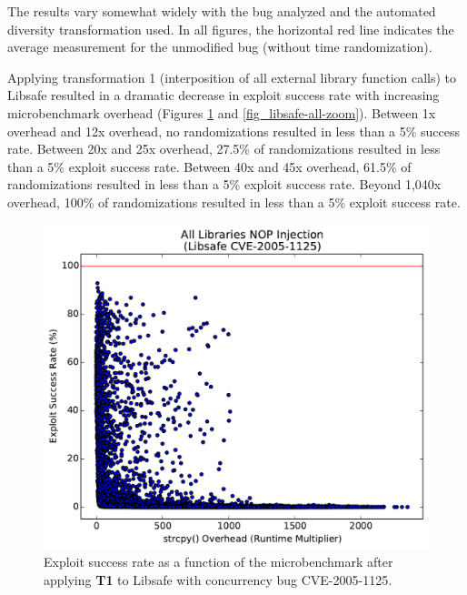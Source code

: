 The results vary somewhat widely with the bug analyzed and the automated diversity transformation used.
In all figures, the horizontal red line indicates the average measurement for the unmodified bug (without time randomization).

Applying transformation 1 (interposition of all external library function calls) to Libsafe resulted in a dramatic decrease in exploit success rate with increasing microbenchmark overhead (Figures \ref{fig_libsafe-all} and \ref{fig_libsafe-all-zoom}).
Between 1x overhead and 12x overhead, no randomizations resulted in less than a 5\% success rate.
Between 20x and 25x overhead, 27.5\% of randomizations resulted in less than a 5\% exploit success rate.
Between 40x and 45x overhead, 61.5\% of randomizations resulted in less than a 5\% exploit success rate.
Beyond 1,040x overhead, 100\% of randomizations resulted in less than a 5\% exploit success rate.
\begin{figure}
	\centering
	\includegraphics[width=\columnwidth]{figures/libsafe-all}
	\caption{Exploit success rate as a function of the microbenchmark after applying \textbf{T1} to Libsafe with concurrency bug CVE-2005-1125.}
	\label{fig_libsafe-all}
\end{figure}
